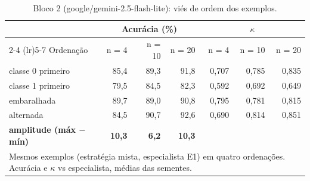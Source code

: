 \begin{table}[htbp]
\centering
\small
\caption{Bloco 2 (google/gemini-2.5-flash-lite): viés de ordem dos exemplos.}
\label{tab:bloco2_E1_ordem_exemplos_flashlite}
\begin{tabular}{lrrrrrr}
\toprule
 & \multicolumn{3}{c}{Acurácia (\%)} & \multicolumn{3}{c}{$\kappa$} \\ \cmidrule(lr){2-4} \cmidrule(lr){5-7}
Ordenação & n = 4 & n = 10 & n = 20 & n = 4 & n = 10 & n = 20 \\
\midrule
classe 0 primeiro & 85,4 & 89,3 & 91,8 & 0,707 & 0,785 & 0,835 \\
classe 1 primeiro & 79,5 & 84,5 & 82,3 & 0,592 & 0,692 & 0,649 \\
embaralhada & 89,7 & 89,0 & 90,8 & 0,795 & 0,781 & 0,815 \\
alternada & 84,5 & 90,7 & 92,6 & 0,690 & 0,814 & 0,851 \\
\midrule
\textbf{amplitude (máx $-$ mín)} & \textbf{10,3} & \textbf{6,2} & \textbf{10,3} &  &  &  \\
\bottomrule
\multicolumn{7}{p{0.95\linewidth}}{\footnotesize Mesmos exemplos (estratégia mista, especialista E1) em quatro ordenações. Acurácia e $\kappa$ vs especialista, médias das sementes.} \\
\end{tabular}
\end{table}

